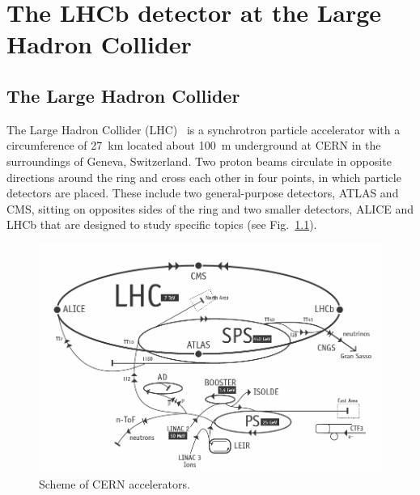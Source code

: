 \chapter{The LHCb detector at the Large Hadron Collider}
\label{ch:detector}

\section{The Large Hadron Collider}

The Large Hadron Collider (LHC)~\cite{Evans:2009zzc} is a synchrotron particle accelerator with a circumference 
of 27~km located about 100~m underground at CERN in the surroundings of Geneva, Switzerland. 
Two proton beams circulate in opposite directions around the ring and cross each
other in four points, in which particle detectors are placed. These include two general-purpose detectors, 
ATLAS and CMS, sitting on opposites sides of the ring and two smaller detectors, 
ALICE and LHCb that are designed to study specific topics (see Fig.~\ref{fig:lhc}).

\begin{figure}[h!]
\centering
\includegraphics[width=1\textwidth]{Detector/figs/LHC_scheme.png}
\caption{Scheme of CERN accelerators.} 
\label{fig:lhc}
\end{figure}

